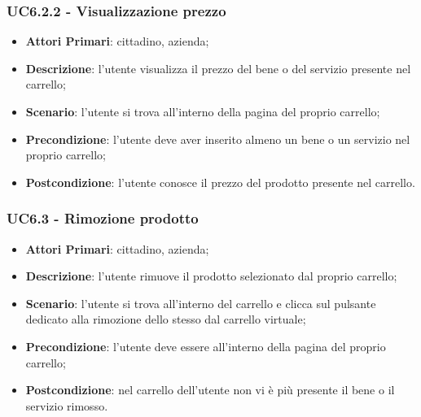  \subsubsection{UC6.2.2 - Visualizzazione prezzo}
\begin{itemize}
	\item \textbf{Attori Primari}: cittadino, azienda\glo;
	\item \textbf{Descrizione}: l'utente visualizza il prezzo del bene o del servizio presente nel carrello;
	\item \textbf{Scenario}: l'utente si trova all'interno della pagina del proprio carrello;
	\item \textbf{Precondizione}: l'utente deve aver inserito almeno un bene o un servizio nel proprio carrello;
	\item \textbf{Postcondizione}: l'utente conosce il prezzo del prodotto presente nel carrello.
\end{itemize}
 \subsubsection{UC6.3 - Rimozione prodotto}
\begin{itemize}
	\item \textbf{Attori Primari}: cittadino, azienda\glo;
	\item \textbf{Descrizione}: l'utente rimuove il prodotto selezionato dal proprio carrello;
	\item \textbf{Scenario}: l'utente si trova all'interno del carrello e clicca sul pulsante dedicato alla rimozione dello stesso dal carrello virtuale;
	\item \textbf{Precondizione}: l'utente deve essere all'interno della pagina del proprio carrello;
	\item \textbf{Postcondizione}: nel carrello dell'utente non vi è più presente il bene o il servizio rimosso.
\end{itemize}